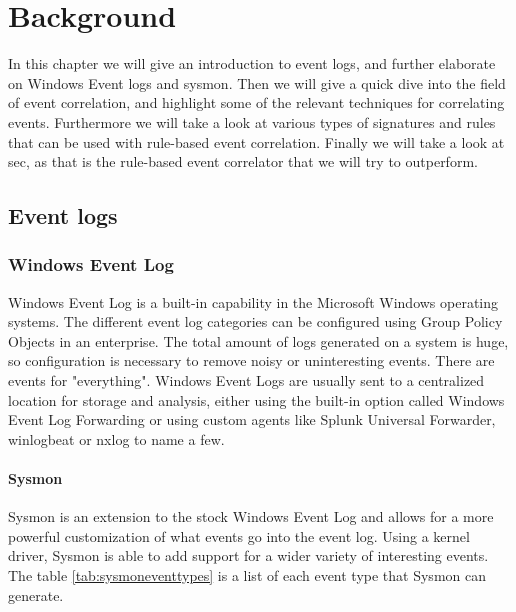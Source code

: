 \chapter{Background}
\label{chap:background}

In this chapter we will give an introduction to event logs, and further elaborate on Windows Event logs and \acrfull{sysmon}.
Then we will give a quick dive into the field of event correlation, and highlight some of the relevant techniques for correlating events.
Furthermore we will take a look at various types of signatures and rules that can be used with rule-based event correlation.
Finally we will take a look at \acrfull{sec}, as that is the rule-based event correlator that we will try to outperform.

\section{Event logs}


\subsection{Windows Event Log}

Windows Event Log is a built-in capability in the Microsoft Windows operating systems. The different event log categories can be configured using Group Policy Objects in an enterprise. The total amount of logs generated on a system is huge, so configuration is necessary to remove noisy or uninteresting events.
There are events for "everything". 
Windows Event Logs are usually sent to a centralized location for storage and analysis, either using the built-in option called Windows Event Log Forwarding or using custom agents like Splunk Universal Forwarder, winlogbeat or nxlog to name a few.

\subsubsection{Sysmon}
Sysmon is an extension to the stock Windows Event Log and allows for a more powerful customization of what events go into the event log. Using a kernel driver, Sysmon is able to add support for a wider variety of interesting events. The table \ref{tab:sysmoneventtypes} is a list of each event type that Sysmon can generate.

